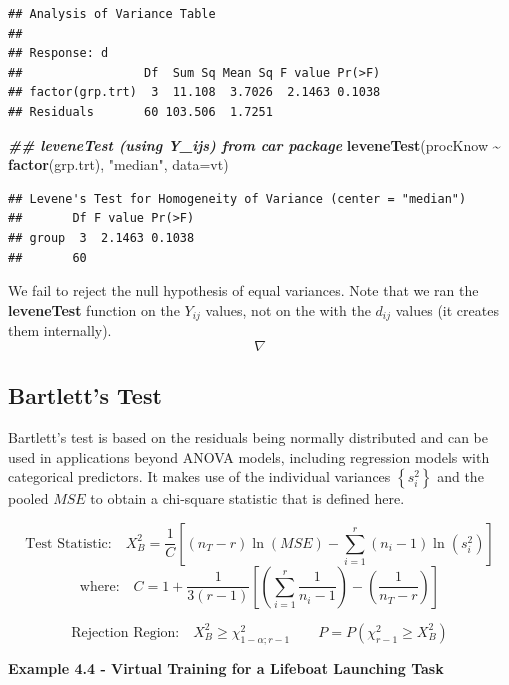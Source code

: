 \documentclass[
]{book}
\newenvironment{Shaded}{\begin{snugshade}}{\end{snugshade}}
\newcommand{\AttributeTok}[1]{\textcolor[rgb]{0.13,0.29,0.53}{#1}}
\newcommand{\DocumentationTok}[1]{\textcolor[rgb]{0.56,0.35,0.01}{\textbf{\textit{#1}}}}
\newcommand{\FunctionTok}[1]{\textcolor[rgb]{0.13,0.29,0.53}{\textbf{#1}}}
\newcommand{\NormalTok}[1]{#1}
\newcommand{\SpecialCharTok}[1]{\textcolor[rgb]{0.81,0.36,0.00}{\textbf{#1}}}
\newcommand{\StringTok}[1]{\textcolor[rgb]{0.31,0.60,0.02}{#1}}
\begin{document}
\begin{verbatim}
## Analysis of Variance Table
## 
## Response: d
##                 Df  Sum Sq Mean Sq F value Pr(>F)
## factor(grp.trt)  3  11.108  3.7026  2.1463 0.1038
## Residuals       60 103.506  1.7251
\end{verbatim}

\begin{Shaded}
\begin{Highlighting}[]
\DocumentationTok{\#\# leveneTest (using Y\_ij\textquotesingle{}s) from car package}
\FunctionTok{leveneTest}\NormalTok{(procKnow }\SpecialCharTok{\textasciitilde{}} \FunctionTok{factor}\NormalTok{(grp.trt), }\StringTok{"median"}\NormalTok{, }\AttributeTok{data=}\NormalTok{vt)  }
\end{Highlighting}
\end{Shaded}

\begin{verbatim}
## Levene's Test for Homogeneity of Variance (center = "median")
##       Df F value Pr(>F)
## group  3  2.1463 0.1038
##       60
\end{verbatim}

We fail to reject the null hypothesis of equal variances. Note that we
ran the \textbf{leveneTest} function on the \(Y_{ij}\) values, not on
the with the \(d_{ij}\) values (it creates them internally).
\[ \nabla \]

\subsection{Bartlett's Test}\label{bartletts-test}

Bartlett's test is based on the residuals being normally distributed and
can be used in applications beyond ANOVA models, including regression
models with categorical predictors. It makes use of the individual
variances \(\left\{s_i^2\right\}\) and the pooled \(MSE\) to obtain a
chi-square statistic that is defined here.

\[
\mbox{Test Statistic:} \quad X_B^2 =
\frac{1}{C}\left[\left(n_T-r\right)\ln(MSE)-\sum_{i=1}^r\left(n_i-1\right)\ln\left(s_i^2\right)\right]
\] \[
\mbox{where:}\quad 
C=1+\frac{1}{3(r-1)}\left[\left(\sum_{i=1}^r\frac{1}{n_i-1}\right)-\left(\frac{1}{n_T-r}\right)\right]
\]

\[
\mbox{Rejection Region:} \quad 
X_B^2 \ge \chi_{1-\alpha;r-1}^2 \qquad
P = P\left(\chi_{r-1}^2 \ge X_B^2\right)
\]

\textbf{Example 4.4 - Virtual Training for a Lifeboat Launching Task}
\end{document}
